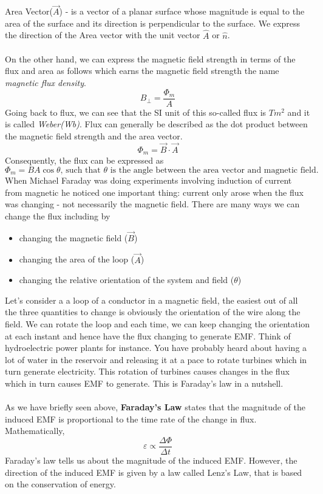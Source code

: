 \documentclass[11pt]{article}
\begin{document}
	Area Vector($\vec{A}$) - is a vector of a planar surface whose magnitude is equal to the area of the surface and its direction is perpendicular to the surface. We express the direction of the Area vector with the unit vector $\hat{A}$ or $\hat{n}$. \\ \\
	On the other hand, we can express the magnetic field strength in terms of the flux and area as follows which earns the magnetic field strength the name \textit{magnetic flux density}.
	$$B_\perp=\dfrac{\Phi_m}{A}$$
	Going back to flux, we can see that the SI unit of this so-called flux is $Tm^2$ and it is called \textit{Weber(Wb)}. Flux can generally be described as the dot product between the magnetic field strength and the area vector.
	$$\Phi_m=\vec{B}\cdot\vec{A}$$
	Consequently, the flux can be expressed as
	$$\Phi_m=BA\cos\theta\text{, such that }\theta\text{ is the angle between the area vector and magnetic field.}$$
	When Michael Faraday was doing experiments involving induction of current from magnetic he noticed one important thing: current only arose when the flux was changing - not necessarily the magnetic field. There are many ways we can change the flux including by
	\begin{itemize}
		\item changing the magnetic field ($\vec{B}$)
		\item changing the area of the loop ($\vec{A}$)
		\item changing the relative orientation of the system and field ($\theta$)
	\end{itemize}
	Let's consider a a loop of a conductor in a magnetic field, the easiest out of all the three quantities to change is obviously the orientation of the wire along the field. We can rotate the loop and each time, we can keep changing the orientation at each instant and hence have the flux changing to generate EMF. Think of hydroelectric power plants for instance. You have probably heard about having a lot of water in the reservoir and releasing it at a pace to rotate turbines which in turn generate electricity. This rotation of turbines causes changes in the flux which in turn causes EMF to generate. This is Faraday's law in a nutshell.\\ \\
	As we have briefly seen above, \textbf{Faraday's Law} states that the magnitude of the induced EMF is proportional to the time rate of the change in flux. Mathematically,
	$$\varepsilon\propto\dfrac{\Delta\Phi}{\Delta t}$$
	Faraday's law tells us about the magnitude of the induced EMF. However, the direction of the induced EMF is given by a law called Lenz's Law, that is based on the conservation of energy.
\end{document}

